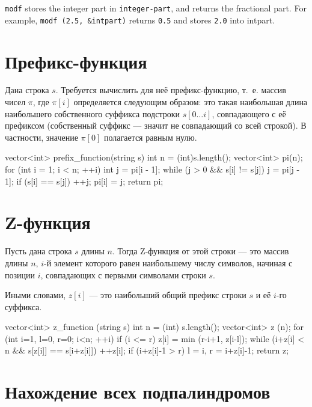 \documentclass[12pt, titlepage]{article}
\renewcommand{\tt}[1]{\texttt{\small #1}}
\begin{document}
\tt{modf} stores the integer part in \tt{*integer-part}, and returns the fractional part. For example, \tt{modf (2.5, \&intpart)} returns \tt{0.5} and stores \tt{2.0} into intpart.


\section{Префикс-функция}

Дана строка $s$. Требуется вычислить для неё префикс-функцию, т.~е. массив чисел $\pi$, где $\pi[i]$ определяется следующим образом: это такая наибольшая длина наибольшего собственного суффикса подстроки $s[0 \ldots i]$, совпадающего с её префиксом (собственный суффикс — значит не совпадающий со всей строкой). В частности, значение $\pi[0]$ полагается равным нулю.

\begin{cppcode}
vector<int> prefix_function(string s)
{
    int n = (int)s.length();
    vector<int> pi(n);
    for (int i = 1; i < n; ++i)
    {
        int j = pi[i - 1];
        while (j > 0 && s[i] != s[j])
            j = pi[j - 1];
        if (s[i] == s[j]) ++j;
        pi[i] = j;
    }
    return pi;
}
\end{cppcode}



\section{Z-функция}

Пусть дана строка $s$ длины $n$. Тогда Z-функция от этой строки — это массив длины $n$, $i$-й элемент которого равен наибольшему числу символов, начиная с позиции $i$, совпадающих с первыми символами строки $s$.

Иными словами, $z[i]$ — это наибольший общий префикс строки $s$ и её $i$-го суффикса.

\begin{cppcode}
vector<int> z_function (string s) {
    int n = (int) s.length();
    vector<int> z (n);
    for (int i=1, l=0, r=0; i<n; ++i) {
        if (i <= r)
            z[i] = min (r-i+1, z[i-l]);
        while (i+z[i] < n && s[z[i]] == s[i+z[i]])
            ++z[i];
        if (i+z[i]-1 > r)
            l = i,  r = i+z[i]-1;
    }
    return z;
}
\end{cppcode}

\section{Нахождение всех подпалиндромов}
\end{document}
